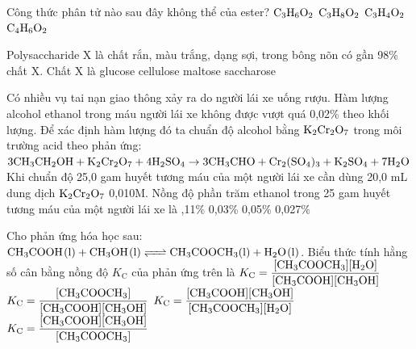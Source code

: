 \documentclass[11pt,a4paper]{article}
\begin{document}
\begin{ex}
Công thức phân tử nào sau đây không thể của ester?
\choice
{$\ce{C3H6O2}$}
{\True $\ce{C3H8O2}$}
{$\ce{C3H4O2}$}
{$\ce{C4H6O2}$}

\end{ex}
\begin{ex}
Polysaccharide X là chất rắn, màu trắng, dạng sợi, trong bông nõn có gần 98\% chất X. Chất X là
\choice
{glucose}
{\True cellulose}
{maltose}
{saccharose}

\end{ex}
\begin{ex}
Có nhiều vụ tai nạn giao thông xảy ra do người lái xe uống rượu. Hàm lượng alcohol ethanol trong máu người lái xe không được vượt quá 0,02\% theo khối lượng. Để xác định hàm lượng đó ta chuẩn độ alcohol bằng $\ce{K2Cr2O7}$ trong môi trường acid theo phản ứng:\\
$3\ce{CH3CH2OH} + \ce{K2Cr2O7} + 4\ce{H2SO4} \rightarrow 3\ce{CH3CHO} + \ce{Cr2(SO4)3} + \ce{K2SO4} + 7\ce{H2O}$\\
Khi chuẩn độ 25,0 gam huyết tương máu của một người lái xe cần dùng 20,0 mL dung dịch $\ce{K2Cr2O7}$ 0,010M. Nồng độ phần trăm ethanol trong 25 gam huyết tương máu của một người lái xe là
\choice
{,11\%}
{0,03\%}
{0,05\%}
{0,027\%}

\end{ex}
\begin{ex}
Cho phản ứng hóa học sau: $\ce{CH3COOH(l) + CH3OH(l) <=> CH3COOCH3(l) + H2O(l)}$. Biểu thức tính hằng số cân bằng nồng độ $K_{\text{C}}$ của phản ứng trên là
\choice
{\True $K_{\text{C}} = \dfrac{[\ce{CH3COOCH3}][\ce{H2O}]}{[\ce{CH3COOH}][\ce{CH3OH}]}$}
{$K_{\text{C}} = \dfrac{[\ce{CH3COOCH3}]}{[\ce{CH3COOH}][\ce{CH3OH}]}$}
{$K_{\text{C}} = \dfrac{[\ce{CH3COOH}][\ce{CH3OH}]}{[\ce{CH3COOCH3}][\ce{H2O}]}$}
{$K_{\text{C}} = \dfrac{[\ce{CH3COOH}][\ce{CH3OH}]}{[\ce{CH3COOCH3}]}$}

\end{ex}
\end{document}
